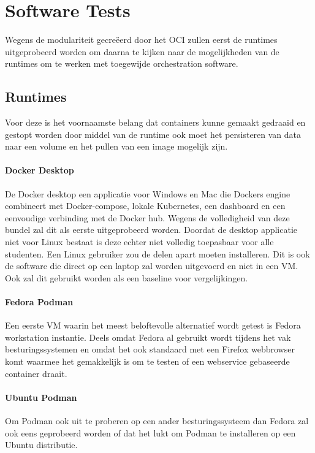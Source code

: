 \section{Software Tests}
Wegens de modulariteit gecreëerd door het OCI zullen eerst de runtimes uitgeprobeerd worden om daarna te kijken naar de mogelijkheden van de runtimes om te werken met toegewijde orchestration software.

\subsection{Runtimes}
Voor deze is het voornaamste belang dat containers kunne gemaakt gedraaid en gestopt worden door middel van de runtime ook moet het persisteren van data naar een volume en het pullen van een image mogelijk zijn.

\paragraph{Docker Desktop}
De Docker desktop een applicatie voor Windows en Mac die Dockers engine combineert met Docker-compose, lokale Kubernetes, een dashboard en een eenvoudige verbinding met de Docker hub. Wegens de volledigheid van deze bundel zal dit als eerste uitgeprobeerd worden. Doordat de desktop applicatie niet voor Linux bestaat is deze echter niet volledig toepasbaar voor alle studenten. Een Linux gebruiker zou de delen apart moeten installeren. Dit is ook de software die direct op een laptop zal worden uitgevoerd en niet in een VM. Ook zal dit gebruikt worden als een baseline voor vergelijkingen. 

\paragraph{Fedora Podman}
Een eerste VM waarin het meest beloftevolle alternatief wordt getest is Fedora workstation instantie. Deels omdat Fedora al gebruikt wordt tijdens het vak besturingssystemen en omdat het ook standaard met een Firefox webbrowser komt waarmee het gemakkelijk is om te testen of een webservice gebaseerde container draait.

\paragraph{Ubuntu Podman}
Om Podman ook uit te proberen op een ander besturingssysteem dan Fedora zal ook eens geprobeerd worden of dat het lukt om Podman te installeren op een Ubuntu distributie.

